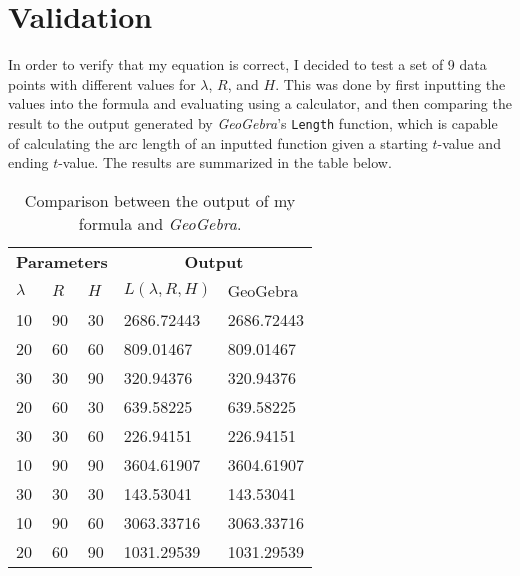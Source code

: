 \section{Validation}

In order to verify that my equation is correct, I decided to test a set of 9 data points with different values for $\lambda$, $R$, and $H$. This was done by first inputting the values into the formula and evaluating using a calculator, and then comparing the result to the output generated by \emph{GeoGebra}'s \texttt{Length} function, which is capable of calculating the arc length of an inputted function given a starting $t$-value and ending $t$-value. The results are summarized in the table below.

\begin{table}[H]
    \centering
    \singlespacing
    \setlength{\tabcolsep}{18pt}
        \begin{tabular}{lllll}
            \toprule
            \multicolumn{3}{c}{\textbf{Parameters}} & \multicolumn{2}{c}{\textbf{Output}}                                         \\
            \cmidrule(r{4pt}){1-3} \cmidrule(l){4-5}
            $\lambda$                               & $R$                                 & $H$ & $L(\lambda, R, H)$ & GeoGebra   \\
            \midrule
            10                                      & 90                                  & 30  & 2686.72443         & 2686.72443 \\
            20                                      & 60                                  & 60  & 809.01467          & 809.01467  \\
            30                                      & 30                                  & 90  & 320.94376          & 320.94376  \\
            20                                      & 60                                  & 30  & 639.58225          & 639.58225  \\
            30                                      & 30                                  & 60  & 226.94151          & 226.94151  \\
            10                                      & 90                                  & 90  & 3604.61907         & 3604.61907 \\
            30                                      & 30                                  & 30  & 143.53041          & 143.53041  \\
            10                                      & 90                                  & 60  & 3063.33716         & 3063.33716 \\
            20                                      & 60                                  & 90  & 1031.29539         & 1031.29539 \\
            \bottomrule
        \end{tabular}
    \caption{Comparison between the output of my formula and \emph{GeoGebra}.}
    \vspace*{-10pt}
\end{table}
